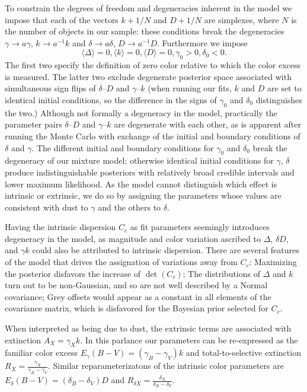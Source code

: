 \documentclass{aastex61}   	%
\begin{document}
To constrain the degrees of freedom and degeneracies inherent in the model we impose that
\color{red}
each of the vectors $k+1/N$ and $D+1/N$ are simplexes, where $N$ is the number of objects in our sample: these
conditions break the 
degeneracies  $\gamma \rightarrow a\gamma$, $k \rightarrow a^{-1}k$ and $\delta \rightarrow a\delta$, $D \rightarrow a^{-1}D$.
Furthermore we impose
\color{black} 
\begin{equation}
\langle \Delta \rangle=0, \langle k \rangle=0, \langle D \rangle=0, \gamma_0 > 0, \delta_0 < 0.
\end{equation}
The first two specify the definition of zero color relative to which the color excess is measured.    The latter two exclude degenerate posterior space
associated
with  simultaneous sign flips of
$\delta$--$D$ and $\gamma$--$k$
\color{red}
(when running our fits, $k$ and $D$ are set to
identical initial conditions, so the difference in the signs of $\gamma_0$ and $\delta_0$ distinguishes the two.)
Although not formally a degeneracy in the model, practically the parameter pairs  $\delta$--$D$ and $\gamma$--$k$ are degenerate with
each other, as is apparent after 
running the Monte Carlo with exchange of the initial  and boundary conditions of $\delta$ and $\gamma$.
The different initial and boundary conditions for $\gamma_0$ and $\delta_0$ break the degeneracy of our mixture model;
otherwise identical initial conditions for $\gamma$, $\delta$ produce indistinguishable posteriors
with relatively broad credible intervals and lower maximum likelihood.
\color{black}
As the model cannot distinguish which effect is intrinsic or extrinsic, we do so
by assigning the parameters whose values are consistent with dust to $\gamma$ and the others to $\delta$.



Having the intrinsic dispersion $C_c$ as fit parameters seemingly introduces degeneracy in the model, as magnitude and color variation
ascribed to $\Delta$, $\delta D$, and $\gamma k$ could also be attributed to intrinsic dispersion.  There are several features of the model
that drives the assignation of variations away from $C_c$:  Maximizing the posterior disfavors the increase of $\det{(C_c)}$;
The distributions of $\Delta$ and $k$ turn out to
be non-Gaussian, and so are not well described by a Normal covariance; Grey offsets would appear as a constant
in all elements of the covariance matrix, which is disfavored for the Bayesian prior selected for $C_c$.

When interpreted as being due to dust, the extrinsic terms are associated with extinction $A_X = \gamma_X k$.  In
this parlance our parameters can be re-expressed as the  familiar color excess
$E_\gamma(B-V) = (\gamma_B-\gamma_V) k$ and total-to-selective extinction $R_X = \frac{\gamma_X}{\gamma_B-\gamma_V}$.
Similar reparameterizatons of the intrinsic color parameters are
$E_\delta(B-V) = (\delta_B-\delta_V) D$ and $R_{\delta X} = \frac{\delta_X}{\delta_B-\delta_V}$.
\end{document}
